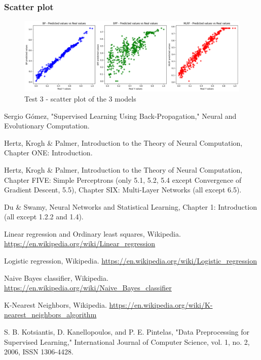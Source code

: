 \documentclass[11pt, a4paper]{article}
\begin{document}
\subsubsection{Scatter plot}

\begin{figure}[H]
    \centering
    \includegraphics[width=400pt]{images/test3_scatter.png}
    \caption{Test 3 - scatter plot of the 3 models}
    \label{fig:image_scatter_comparison_3}
\end{figure}

\newpage

\begin{thebibliography}{11}

Sergio Gómez, "Supervised Learning Using Back-Propagation," Neural and Evolutionary Computation. 

Hertz, Krogh \& Palmer, Introduction to the Theory of Neural Computation, Chapter ONE: Introduction.

Hertz, Krogh \& Palmer, Introduction to the Theory of Neural Computation, Chapter FIVE: Simple Perceptrons (only 5.1, 5.2, 5.4 except Convergence of Gradient Descent, 5.5), Chapter SIX: Multi-Layer Networks (all except 6.5).

Du \& Swamy, Neural Networks and Statistical Learning, Chapter 1: Introduction (all except 1.2.2 and 1.4).

Linear regression and Ordinary least squares, Wikipedia. \url{https://en.wikipedia.org/wiki/Linear_regression}

Logistic regression, Wikipedia. \url{https://en.wikipedia.org/wiki/Logistic_regression}

Naive Bayes classifier, Wikipedia. \url{https://en.wikipedia.org/wiki/Naive_Bayes_classifier}

K-Nearest Neighbors, Wikipedia. \url{https://en.wikipedia.org/wiki/K-nearest_neighbors_algorithm}

S. B. Kotsiantis, D. Kanellopoulos, and P. E. Pintelas, "Data Preprocessing for Supervised Learning," International Journal of Computer Science, vol. 1, no. 2, 2006, ISSN 1306-4428.

\end{thebibliography}
\end{document}
